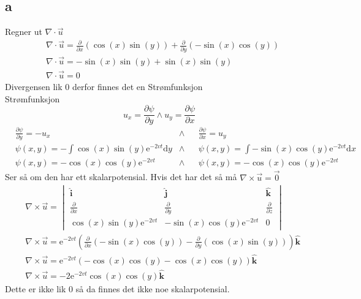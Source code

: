 \documentclass[a4paper,10pt,norsk]{article}
\newcommand{\dd}[1]{\mathrm{d}#1}
\newcommand{\uvec}[1]{\boldsymbol{\hat{\textbf{#1}}}}
\begin{document}
	\subsection*{a}
		Regner ut $\nabla \cdot \vec{u} $ 
		\begin{align*}
			&\nabla \cdot \vec{u} = \frac{\partial }{\partial x} \left( \cos(x) \sin(y)  \right) + \frac{\partial }{\partial y} \left( -\sin(x) \cos(y)  \right) \\
			&\nabla \cdot \vec{u} = - \sin(x) \sin(y) + \sin(x) \sin(y) \\
			&\nabla \cdot \vec{u} = 0
		\end{align*}
		Divergensen lik $0$ derfor finnes det en Strømfunksjon\\
		Strømfunksjon \[
		u_x = \frac{\partial \psi}{\partial y}  \wedge u_y = \frac{\partial \psi}{\partial x} 
		\] 
		\begin{align*}
			& \frac{\partial \psi}{\partial y} = -u_x
			& \wedge &
			& \frac{\partial \psi}{\partial x} = u_y\\
			& \psi (x,y) = - \int \cos(x) \sin(y) \mathrm{e} ^{-2vt} \dd{y}
			& \wedge &
			& \psi (x,y) = \int -\sin(x) \cos(y) \mathrm{e}^{-2vt} \dd{x}\\
			& \psi (x,y) = - \cos(x) \cos(y)  \mathrm{e}^{-2vt} 
			& \wedge &
			& \psi (x,y) = - \cos(x) \cos(y)  \mathrm{e}^{-2vt} 
		\end{align*}
		Ser så om den har ett skalarpotensial. Hvis det har det så må  $\nabla \times \vec{u} =\vec{0} $
		\begin{align*}
			& \nabla \times \vec{u} =
			\begin{vmatrix}
				\uvec{i} &\uvec{j} & \uvec{k}\\
				\frac{\partial }{\partial x} & \frac{\partial }{\partial y} & \frac{\partial }{\partial z} \\
				\cos(x) \sin(y) \mathrm{e}^{-2vt} & - \sin(x) \cos(y) \mathrm{e}^{-2vt} & 0
			\end{vmatrix}\\
			& \nabla \times \vec{u} = \mathrm{e}^{-2vt}\left( \frac{\partial }{\partial x} \left( -\sin(x) \cos(y)  \right) - \frac{\partial }{\partial y} \left( \cos(x) \sin(y)  \right)  \right)  \uvec{k}\\
			& \nabla \times \vec{u} = \mathrm{e}^{-2vt}\left( - \cos(x) \cos(y)  - \cos(x) \cos(y)  \right) \uvec{k}\\
			& \nabla \times \vec{u} = -2\mathrm{e}^{-2vt} \cos(x) \cos(y) \uvec{k}
		\end{align*}
		Dette er ikke lik $0$ så da finnes det ikke noe skalarpotensial.
\end{document}
